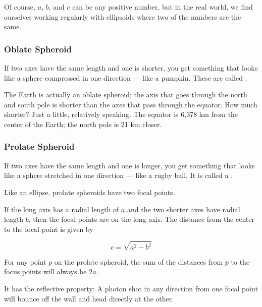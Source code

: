 Of course, $a$, $b$, and $c$ can be any positive number, but in the
real world, we find ourselves working regularly with ellipsoids where two
of the numbers are the same.

\subsubsection{Oblate Spheroid}

If two axes have the same length and one is shorter, you get something
that looks like a sphere compressed in one direction --- like a
pumpkin. These are called .

The Earth is actually an oblate spheroid; the axis that goes through
the north and south pole is shorter than the axes that pass through
the equator. How much shorter? Just a little, relatively speaking. The equator is 6,378 km
from the center of the Earth; the north pole is 21 km closer.

\subsubsection{Prolate Spheroid}

If two axes have the same length and one is longer, you get something
that looks like a sphere stretched in one direction --- like a rugby
ball. It is called a .

Like an ellipse, prolate spheroids have two focal points.

\begin{mdframed}[style=important, frametitle={Focal Points of a Prolate Spheroid}]

  If the long axis has a radial length of $a$ and the two shorter axes
  have radial length $b$, then the focal points are on the long axis. The distance from the center to the focal point is given by

  $$c = \sqrt{a^2 - b^2}$$

  For any point $p$ on the prolate spheroid, the sum of the distances
  from $p$ to the focus points will always be $2a$.

  It has the reflective property: A photon shot in any direction
  from one focal point will bounce off the wall and head directly at the other.

\end{mdframed}

